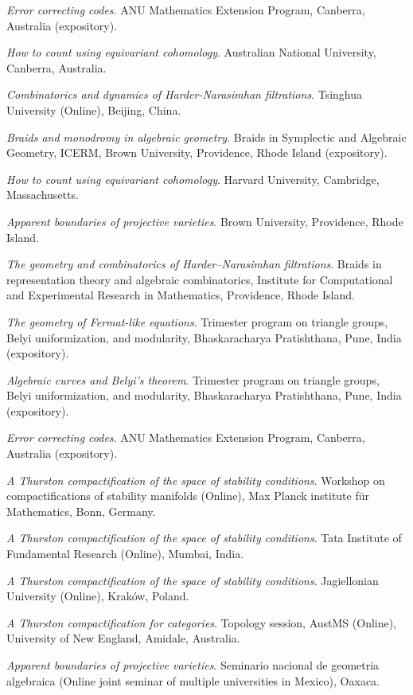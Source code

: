 \documentclass[11pt]{article}
\begin{document}
\begin{description}
\emph{Error correcting codes}.
ANU Mathematics Extension Program, Canberra, Australia (expository).

\emph{How to count using equivariant cohomology}.
Australian National University, Canberra, Australia.

\emph{Combinatorics and dynamics of Harder-Narasimhan filtrations}.
Tsinghua University (Online), Beijing, China.

\emph{Braids and monodromy in algebraic geometry}.
Braids in Symplectic and Algebraic Geometry, ICERM, Brown University, Providence, Rhode Island (expository).

\emph{How to count using equivariant cohomology}.
Harvard University, Cambridge, Massachusetts.

\emph{Apparent boundaries of projective varieties}.
Brown University, Providence, Rhode Island.

\emph{The geometry and combinatorics of Harder--Narasimhan filtrations}.
Braids in representation theory and algebraic combinatorics, Institute for Computational and Experimental Research in Mathematics, Providence, Rhode Island.

\emph{The geometry of Fermat-like equations}.
Trimester program on triangle groups, Belyi uniformization, and modularity, Bhaskaracharya Pratishthana, Pune, India (expository).
\item[{2021}] \emph{Algebraic curves and Belyi's theorem}.
Trimester program on triangle groups, Belyi uniformization, and modularity, Bhaskaracharya Pratishthana, Pune, India (expository).

\emph{Error correcting codes}.
ANU Mathematics Extension Program, Canberra, Australia (expository).

\emph{A Thurston compactification of the space of stability conditions}.
Workshop on compactifications of stability manifolds (Online), Max Planck institute für Mathematics, Bonn, Germany.

\emph{A Thurston compactification of the space of stability conditions}.
Tata Institute of Fundamental Research (Online), Mumbai, India.

\emph{A Thurston compactification of the space of stability conditions}.
Jagiellonian University (Online), Kraków, Poland.
\item[{2020}] \emph{A Thurston compactification for categories}.
Topology session, AustMS (Online), University of New England, Amidale, Australia.

\emph{Apparent boundaries of projective varieties}.
Seminario nacional de geometria algebraica (Online joint seminar of multiple universities in Mexico), Oaxaca.


\end{description}
\end{document}
